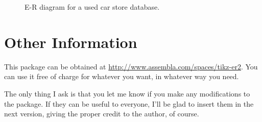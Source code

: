 \documentclass[12pt]{article}
\newcommand{\demo}[1]{
  \bigskip
  \begin{minipage}{\linewidth}
      \begin{center}
          
      \end{center}
      \begin{center}
          \scriptsize
          \inputminted{latex}{snippets/#1.tex}
      \end{center}
  \end{minipage}
}
\begin{document}
\begin{figure}[htb!]
    \demo{cars}
    \caption{E-R diagram for a used car store database.}
\label{fig:cars}
\end{figure}

\section{Other Information}
\label{sec:other-information}

This package can be obtained at
\url{http://www.assembla.com/spaces/tikz-er2}. You can use it
free of charge for whatever you want, in whatever way you need.

The only thing I ask is that you let me know if you make any modifications to
the package. If they can be useful to everyone, I'll be glad to insert them in
the next version, giving the proper credit to the author, of course.

\newpage

\appendix
\end{document}
